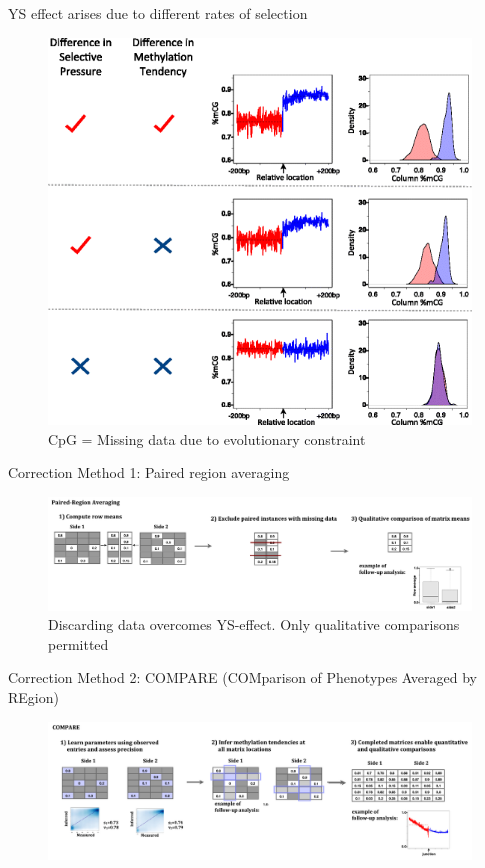 \documentclass[10pt]{beamer}
\begin{document}
\begin{frame}[fragile]{YS effect arises due to different rates of selection}
\begin{figure}
\includegraphics[scale=0.4]{img/fig2}
\caption{CpG = Missing data due to evolutionary constraint}
\end{figure}
\end{frame}

\begin{frame}[fragile]{Correction Method 1: Paired region averaging}
\begin{figure}
\includegraphics[scale=0.33]{img/method1}
\caption{Discarding data overcomes YS-effect. Only qualitative comparisons permitted}
\end{figure}
\end{frame}

\begin{frame}[fragile]{Correction Method 2: COMPARE (COMparison of
Phenotypes Averaged by REgion)}
\begin{figure}
\includegraphics[width=\textwidth]{img/method2}
\end{figure}
\end{frame}
\end{document}
